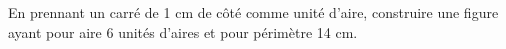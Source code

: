 \documentclass[exercice]{thedocument}%
\begin{document}
%
En prennant un carré de 1 cm de côté comme unité d'aire, construire une
figure ayant pour aire 6 unités d'aires et pour périmètre 14 cm.
\end{document}
